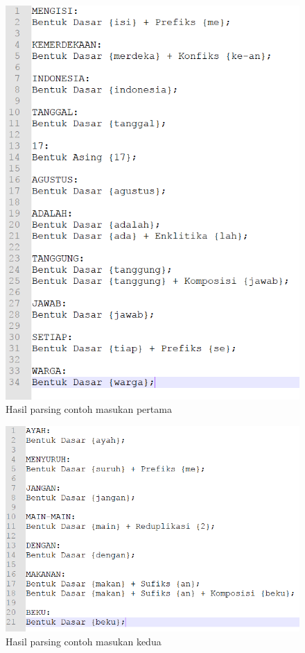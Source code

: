 \begin{figure}[H]
\centering
\includegraphics[scale=0.7]{Gambar/hasil-parsing-1}
\caption{Hasil parsing contoh masukan pertama} 
\label{hasil-parsing-1}
\end{figure}

\begin{figure}[H]
\centering
\includegraphics[scale=0.7]{Gambar/hasil-parsing-2}
\caption{Hasil parsing contoh masukan kedua} 
\label{hasil-parsing-2}
\end{figure}

